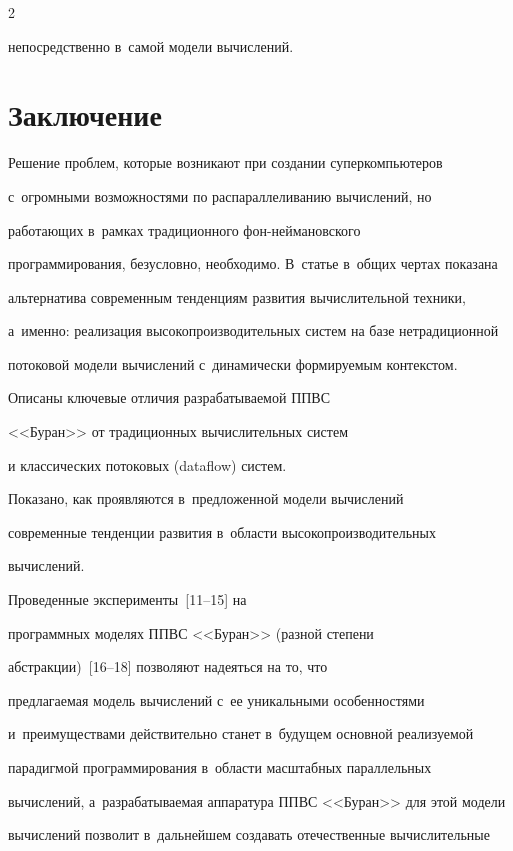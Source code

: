 \begin{multicols}{2}
\begin{description}
непосредственно в~самой модели вычислений.

\end{description}

  

\section{Заключение}



  Решение проблем, которые возникают при созда\-нии суперкомпьютеров 

с~огромными возможностями по распараллеливанию вычислений, но 

работающих в~рамках традиционного фон-ней\-ма\-нов\-ско\-го 

программирования, безусловно, необходимо. В~статье в~общих чертах показана 

альтернатива современным тенденциям развития вычислительной техники, 

а~именно: реализация высокопроизводительных систем на базе нетрадиционной 

потоковой модели вычислений с~динамически формируемым контекстом. 

Описаны ключевые отличия разрабатываемой ППВС

<<Буран>> от традиционных вычислительных систем 

и классических потоковых (dataflow) систем.

  

  Показано, как проявляются в~предложенной модели вычислений 

современные тенденции развития в~области высокопроизводительных 

вычислений.

  

  Проведенные эксперименты~[11--15] на 

программных моделях ППВС <<Буран>> (разной степени  

абстракции)~[16--18] позволяют надеяться на то, что 

предлагаемая модель вычислений с~ее уникальными особенностями 

и~преимуществами действительно станет в~будущем основной реализуемой 

парадигмой программирования в~области масштабных параллельных 

вычислений, а~разрабатываемая аппаратура ППВС <<Буран>> для этой модели 

вычислений позволит в~дальнейшем создавать отечественные вычислительные 


\end{multicols}
